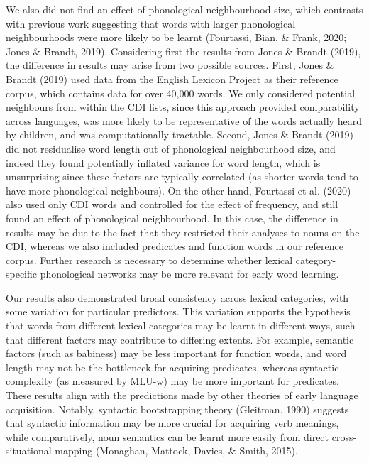 \documentclass[10pt, letterpaper]{article}
\begin{document}
We also did not find an effect of phonological neighbourhood size, which
contrasts with previous work suggesting that words with larger
phonological neighbourhoods were more likely to be learnt (Fourtassi,
Bian, \& Frank, 2020; Jones \& Brandt, 2019). Considering first the
results from Jones \& Brandt (2019), the difference in results may arise
from two possible sources. First, Jones \& Brandt (2019) used data from
the English Lexicon Project as their reference corpus, which contains
data for over 40,000 words. We only considered potential neighbours from
within the CDI lists, since this approach provided comparability across
languages, was more likely to be representative of the words actually
heard by children, and was computationally tractable. Second, Jones \&
Brandt (2019) did not residualise word length out of phonological
neighbourhood size, and indeed they found potentially inflated variance
for word length, which is unsurprising since these factors are typically
correlated (as shorter words tend to have more phonological neighbours).
On the other hand, Fourtassi et al. (2020) also used only CDI words and
controlled for the effect of frequency, and still found an effect of
phonological neighbourhood. In this case, the difference in results may
be due to the fact that they restricted their analyses to nouns on the
CDI, whereas we also included predicates and function words in our
reference corpus. Further research is necessary to determine whether
lexical category-specific phonological networks may be more relevant for
early word learning.

Our results also demonstrated broad consistency across lexical
categories, with some variation for particular predictors. This
variation supports the hypothesis that words from different lexical
categories may be learnt in different ways, such that different factors
may contribute to differing extents. For example, semantic factors (such
as babiness) may be less important for function words, and word length
may not be the bottleneck for acquiring predicates, whereas syntactic
complexity (as measured by MLU-w) may be more important for predicates.
These results align with the predictions made by other theories of early
language acquisition. Notably, syntactic bootstrapping theory (Gleitman,
1990) suggests that syntactic information may be more crucial for
acquiring verb meanings, while comparatively, noun semantics can be
learnt more easily from direct cross-situational mapping (Monaghan,
Mattock, Davies, \& Smith, 2015).
\end{document}
